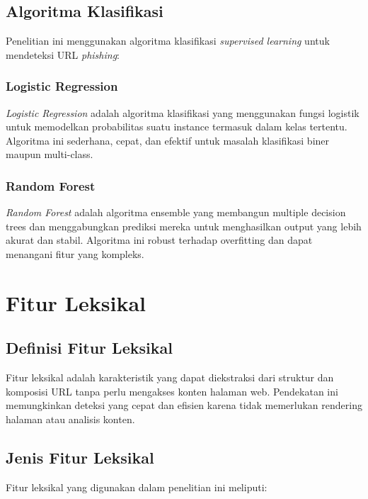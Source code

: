 \subsection{Algoritma Klasifikasi}

Penelitian ini menggunakan algoritma klasifikasi \textit{supervised learning} untuk mendeteksi URL \textit{phishing}:

\subsubsection{Logistic Regression}

\textit{Logistic Regression} adalah algoritma klasifikasi yang menggunakan fungsi logistik untuk memodelkan probabilitas suatu instance termasuk dalam kelas tertentu. Algoritma ini sederhana, cepat, dan efektif untuk masalah klasifikasi biner maupun multi-class.

\subsubsection{Random Forest}

\textit{Random Forest} adalah algoritma ensemble yang membangun multiple decision trees dan menggabungkan prediksi mereka untuk menghasilkan output yang lebih akurat dan stabil. Algoritma ini robust terhadap overfitting dan dapat menangani fitur yang kompleks.

\section{Fitur Leksikal}

\subsection{Definisi Fitur Leksikal}

Fitur leksikal adalah karakteristik yang dapat diekstraksi dari struktur dan komposisi URL tanpa perlu mengakses konten halaman web. Pendekatan ini memungkinkan deteksi yang cepat dan efisien karena tidak memerlukan rendering halaman atau analisis konten.

\subsection{Jenis Fitur Leksikal}

Fitur leksikal yang digunakan dalam penelitian ini meliputi:

